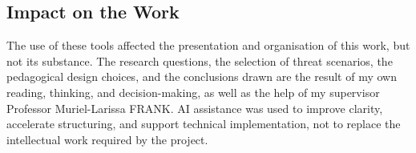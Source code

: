 \documentclass[sigconf, authorversion=true, nonacm=true]{acmart}%
\begin{document}
\subsection*{Impact on the Work}

The use of these tools affected the presentation and organisation of this work, but not its substance. The research questions, the selection of threat scenarios, the pedagogical design choices, and the conclusions drawn are the result of my own reading, thinking, and decision-making, as well as the help of my supervisor Professor Muriel-Larissa FRANK. AI assistance was used to improve clarity, accelerate structuring, and support technical implementation, not to replace the intellectual work required by the project.



\end{document}
